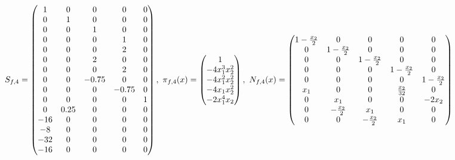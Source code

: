 \documentclass[fleqn]{article}
\begin{document}
\begin{align}
    S_{f,4} = \pmqty{ 1 & 0 & 0 & 0 & 0 \\ 0 & 1 & 0 & 0 & 0 \\ 0 & 0 & 1 & 0 & 0 \\ 0 & 0 & 0 & 1 & 0 \\ 0 & 0 & 0 & 2 & 0 \\ 0 & 0 & 2 & 0 & 0 \\ 0 & 0 & 0 & 2 & 0 \\ 0 & 0 & -0.75 & 0 & 0 \\ 0 & 0 & 0 & -0.75 & 0 \\ 0 & 0 & 0 & 0 & 1 \\ 0 & 0.25 & 0 & 0 & 0 \\ -16 & 0 & 0 & 0 & 0 \\ -8 & 0 & 0 & 0 & 0 \\ -32 & 0 & 0 & 0 & 0 \\ -16 & 0 & 0 & 0 & 0 }
    ,~
    \pi_{f,4}(x) = \pmqty{
        1                \\
        -4x_{1}^3x_{2}^2 \\
        -4x_{1}^2x_{2}^2 \\
        -4x_{1}x_{2}^2   \\
        -2x_{1}^4x_{2}   \\
    }
    ,~
    N_{f,4}(x) = \pmqty{
        1-\frac{x_{2}}{2} & 0                 & 0                 & 0                 & 0                 \\
        0                 & 1-\frac{x_{2}}{2} & 0                 & 0                 & 0                 \\
        0                 & 0                 & 1-\frac{x_{2}}{2} & 0                 & 0                 \\
        0                 & 0                 & 0                 & 1-\frac{x_{2}}{2} & 0                 \\
        0                 & 0                 & 0                 & 0                 & 1-\frac{x_{2}}{2} \\
        x_{1}             & 0                 & 0                 & \frac{x_{2}}{32}  & 0                 \\
        0                 & x_{1}             & 0                 & 0                 & -2x_{2}           \\
        0                 & -\frac{x_{2}}{2}  & x_{1}             & 0                 & 0                 \\
        0                 & 0                 & -\frac{x_{2}}{2}  & x_{1}             & 0                 \\
    }
\end{align}
\end{document}
